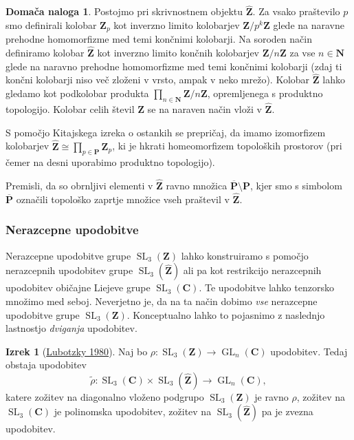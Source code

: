 \documentclass[11pt]{book}
\def\NN{\mathbf{N}}
\def\ZZ{\mathbf{Z}}
\def\CC{\mathbf{C}}
\def\PP{\mathbf{P}}
\DeclareMathOperator\GL{GL}
\DeclareMathOperator\SL{SL}
\theoremstyle{definition}
\theoremstyle{zgled}
\theoremstyle{zgledbrezstevilke}
\theoremstyle{odprtproblem}
\theoremstyle{domacanaloga}
\newtheorem{domacanaloga}[theorem]{Domača naloga}
\theoremstyle{izrek}
\newtheorem{izrek}[theorem]{Izrek}
\begin{document}
\begin{domacanaloga}
Postojmo pri skrivnostnem objektu $\widehat{\ZZ}$. Za vsako praštevilo $p$ smo definirali kolobar $\ZZ_p$ kot inverzno limito kolobarjev $\ZZ/p^k\ZZ$ glede na naravne prehodne homomorfizme med temi končnimi kolobarji. Na soroden način definiramo kolobar $\widehat{\ZZ}$ kot inverzno limito končnih kolobarjev $\ZZ/n\ZZ$ za vse $n \in \NN$ glede na naravno prehodne homomorfizme med temi končnimi kolobarji (zdaj ti končni kolobarji niso več zloženi v vrsto, ampak v neko mrežo). Kolobar $\widehat{\ZZ}$ lahko gledamo kot podkolobar produkta $\prod_{n \in \NN} \ZZ/n\ZZ$, opremljenega s produktno topologijo. Kolobar celih števil $\ZZ$ se na naraven način vloži v $\widehat{\ZZ}$.

S pomočjo Kitajskega izreka o ostankih se prepričaj, da imamo izomorfizem kolobarjev $\widehat{\ZZ} \cong \prod_{p \in \PP} \ZZ_p$, ki je hkrati homeomorfizem topoloških prostorov (pri čemer na desni uporabimo produktno topologijo).

Premisli, da so obrnljivi elementi v $\widehat{\ZZ}$ ravno množica $\overline{\PP} \setminus \PP$, kjer smo s simbolom $\overline{\PP}$ označili topološko zaprtje množice vseh praštevil v $\widehat{\ZZ}$.
\end{domacanaloga}

\subsubsection{Nerazcepne upodobitve}

Nerazcepne upodobitve grupe $\SL_3(\ZZ)$ lahko konstruiramo s pomočjo nerazcepnih upodobitev grupe $\SL_3(\widehat{\ZZ})$ ali pa kot restrikcijo nerazcepnih upodobitev običajne Liejeve grupe $\SL_3(\CC)$. Te upodobitve lahko tenzorsko množimo med seboj. Neverjetno je, da na ta način dobimo \emph{vse} nerazcepne upodobitve grupe $\SL_3(\ZZ)$. Konceptualno lahko to pojasnimo z naslednjo lastnostjo \emph{dviganja} upodobitev.

\begin{izrek}[\href{https://www.jstor.org/stable/2374092}{Lubotzky 1980}]
Naj bo $\rho \colon \SL_3(\ZZ) \to \GL_n(\CC)$ upodobitev. Tedaj obstaja upodobitev
\[
    \textstyle \tilde \rho \colon \SL_3(\CC) \times \SL_3(\widehat{\ZZ}) \to \GL_n(\CC),  
\]
katere zožitev na diagonalno vloženo podgrupo $\SL_3(\ZZ)$ je ravno $\rho$, zožitev na $\SL_3(\CC)$ je polinomska upodobitev, zožitev na $\SL_3(\widehat{\ZZ})$ pa je zvezna upodobitev.
\end{izrek}
\end{document}
